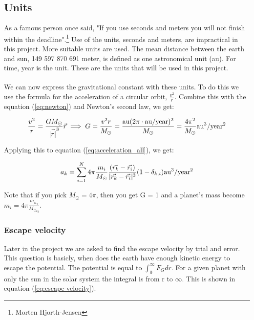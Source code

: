 \subsection{Units}\label{sec:units}
As a famous person once said, "If you use seconds and meters you will not finish within the deadline".\footnote{Morten Hjorth-Jensen} Use of the units, seconds and meters, are impractical in this project. More suitable units are used. The mean distance between the earth and sun, 149 597 870 691 meter, is defined as one astronomical unit (au). For time, year is the unit.
These are the units that will be used in this project. 
\\
\\
We can now express the gravitational constant with these units. To do this we use the formula for the acceleration of a circular orbit, $\frac{v^2}{r}$. Combine this with the equation (\ref{eq:newton}) and Newton's second law, we get: 

\begin{align*}
	\frac{v^2}{r} =
	\frac{GM_{\odot}}{\vec{|r|}^3}\vec{r} 
	\implies 
	G
	=
	\frac{v^2 r}{M_{\odot}} = \frac{\rm{au} (2\pi \cdot \rm{au/year})^2}{M_{\odot}}
	=
	\frac{4\pi^2}
	{M_{\odot}} \rm{au^3/year^2}
\end{align*}

Applying this to equation (\ref{eq:acceleration_all}), we get: 

\begin{align}
	a_k
	=
	\sum_{i = 1}^{N}
	4 \pi \frac{m_i}{M_{\odot}}
	\frac{(\vec{r_k} - \vec{r_i})}
	{|\vec{r_k} - \vec{r_i}|^3}
	(1 - \delta_{k,i}) \rm{au^3/year^2}
	\label{eq:acceleration_all_au}
\end{align}

Note that if you pick $M_\odot = 4 \pi$, then you get G = 1 and a planet's mass become $m_i = 4\pi \frac{m_{i_{kg}}} {M_{\odot_{kg}}}$.







\subsubsection{Escape velocity}\label{sec:escape-velocity}

Later in the project we are asked to find the escape velocity by trial and error. This question is basicly, when does the earth have enough kinetic energy to escape the potential. The potential is equal to $\int_0^\infty F_G dr$. For a given planet with only the sun in the solar system the integral is from r to $\infty$. This is shown in equation (\ref{eq:escape-velocity}).  


